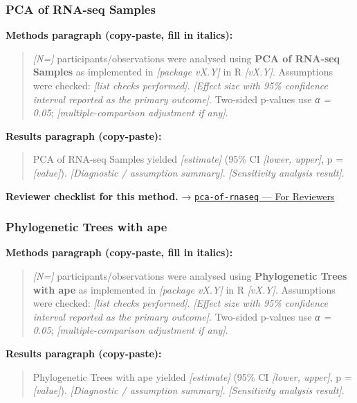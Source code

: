 \documentclass[
]{article}
\begin{document}
\subsubsection{PCA of RNA-seq Samples}\label{pca-of-rna-seq-samples}

\textbf{Methods paragraph (copy-paste, fill in italics):}

\begin{quote}
\emph{{[}N={]}} participants/observations were analysed using
\textbf{PCA of RNA-seq Samples} as implemented in \emph{{[}package
vX.Y{]}} in R \emph{{[}vX.Y{]}}. Assumptions were checked: \emph{{[}list
checks performed{]}}. \emph{{[}Effect size with 95\% confidence interval
reported as the primary outcome{]}}. Two-sided p-values use \emph{α =
0.05}; \emph{{[}multiple-comparison adjustment if any{]}}.
\end{quote}

\textbf{Results paragraph (copy-paste):}

\begin{quote}
PCA of RNA-seq Samples yielded \emph{{[}estimate{]}} (95\% CI
\emph{{[}lower, upper{]}}, p = \emph{{[}value{]}}). \emph{{[}Diagnostic
/ assumption summary{]}}. \emph{{[}Sensitivity analysis result{]}}.
\end{quote}

\textbf{Reviewer checklist for this method.} →
\href{../chapters/12-bioinformatics/pca-of-rnaseq.Rmd\#for-reviewers}{\texttt{pca-of-rnaseq}
--- For Reviewers}

\subsubsection{Phylogenetic Trees with
ape}\label{phylogenetic-trees-with-ape}

\textbf{Methods paragraph (copy-paste, fill in italics):}

\begin{quote}
\emph{{[}N={]}} participants/observations were analysed using
\textbf{Phylogenetic Trees with ape} as implemented in \emph{{[}package
vX.Y{]}} in R \emph{{[}vX.Y{]}}. Assumptions were checked: \emph{{[}list
checks performed{]}}. \emph{{[}Effect size with 95\% confidence interval
reported as the primary outcome{]}}. Two-sided p-values use \emph{α =
0.05}; \emph{{[}multiple-comparison adjustment if any{]}}.
\end{quote}

\textbf{Results paragraph (copy-paste):}

\begin{quote}
Phylogenetic Trees with ape yielded \emph{{[}estimate{]}} (95\% CI
\emph{{[}lower, upper{]}}, p = \emph{{[}value{]}}). \emph{{[}Diagnostic
/ assumption summary{]}}. \emph{{[}Sensitivity analysis result{]}}.
\end{quote}
\end{document}

